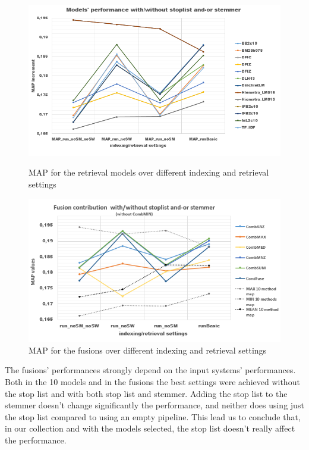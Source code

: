 	\begin{figure}[H]
		\begin{minipage}{0.5\linewidth}
			\centering
			\includegraphics[width=\linewidth]{../eval/results-img-graphs/MAPModSMSW.png}
			\caption{MAP for the retrieval models over different indexing and retrieval settings}				
			\label{fig:MAPMod}
		\end{minipage}
		\begin{minipage}{0.5\linewidth}
			\centering
			\includegraphics[width=\linewidth]{../eval/results-img-graphs/MAPFusSMSW.png}
			\caption{MAP for the fusions over different indexing and retrieval settings}				
			\label{fig:MAPFus}
		\end{minipage}
	\end{figure}

	The fusions' performances strongly depend on the input systems' performances. Both in the 10 models and in the fusions the best settings were achieved without the stop list and with both stop list and stemmer.
	Adding the stop list to the stemmer doesn't change significantly the performance, and neither does using just the stop list compared to using an empty pipeline.
	This lead us to conclude that, in our collection and with the models selected, the stop list doesn't really affect the performance.
	
